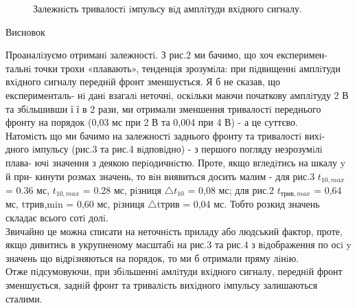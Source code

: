 \documentclass[a4paper,14pt]{extreport}
\begin{document}
 \begin{figure}[h!]
    \caption{  Залежнiсть тривалостi iмпульсу вiд амплiтуди вхiдного сигналу.}
    \label{ris2}
  \end{figure}
\clearpage 
\begin{center}
Висновок
\end{center}

Проаналiзуємо отриманi залежностi. З рис.2 ми бачимо, що хоч експеримен-
тальнi точки трохи «плавають», тенденцiя зрозумiла: при пiдвищеннi амплiтуди
вхiдного сигналу переднiй фронт зменшується. Я б не сказав, що експерименталь-
нi данi взагалi неточнi, оскiльки маючи початкову амплiтуду 2 В та збiльшивши
ї ї в 2 рази, ми отримали зменшення тривалостi переднього фронту на порядок
(0,03 мс при 2 В та 0,004 при 4 В) - а це суттєво.\\ 

Натомiсть що ми бачимо на залежностi заднього фронту та тривалостi вихi-
дного iмпульсу (рис.3 та рис.4 вiдповiдно) - з першого погляду незрозумiлi плава-
ючi значення з деякою перiодичнiстю. Проте, якщо вгледiтись на шкалу
 y
 й при-
кинути розмах значень, то вiн виявиться досить малим - для рис.3 $t_{10,max}$
 = 0.36
мс,
 $t_{10,max}$ = 0.28
 мс, рiзниця
 $\triangle t_{10}$ = 0,08
 мс; для рис.2
 $t_{\text{трив},max}$ = 0,64
 мс,
tтрив,min = 0,60 мс, рiзниця $\triangle$tтрив = 0,04 мс. Тобто розкид значень складає всього
сотi долi.\\ 

Звичайно це можна списати на неточнiсть приладу або людський фактор,
проте, якщо дивитись в укрупненому масштабi на рис.3 та рис.4 з вiдображення
по осi y  значень що вiдрiзняються на порядок, то ми б отримали пряму лiнiю.\\ 

Отже пiдсумовуючи, при збiльшеннi амлiтуди вхiдного сигналу, переднiй
фронт зменшується, заднiй фронт та тривалiсть вихiдного iмпульсу залишаються
сталими.
\end{document}
